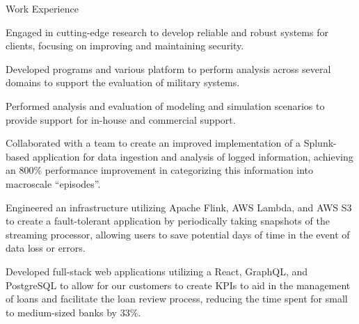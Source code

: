 \documentclass{resume} %
\begin{document}

\begin{workSection}{Work Experience}
    \experienceItem[
        company=Georgia Tech Research Institute (GTRI),
        location=Atlanta{,} GA,
        position=Graduate Research Assistant,
        duration=May 2024\textendash{Present}
    ]
    \begin{bullets}
        \item Engaged in cutting-edge research to develop reliable and robust systems for clients, focusing on improving and maintaining security.
        \item Developed programs and various platform to perform analysis across several domains to support the evaluation of military systems.
        \item Performed analysis and evaluation of modeling and simulation scenarios to provide support for in-house and commercial support.
    \end{bullets}
    
    \experienceItem[
        company=Splunk,
        location=San Jose{,} CA,
        position=Backend Software Engineer Intern,
        duration=May 2023\textendash{July 2023}
    ]
    \begin{bullets}
        \item Collaborated with a team to create an improved implementation of a Splunk-based application for data ingestion and analysis of logged information, achieving an 800\% performance improvement in categorizing this information into macroscale ``episodes''.
        \item Engineered an infrastructure utilizing Apache Flink, AWS Lambda, and AWS S3 to create a fault-tolerant application by periodically taking snapshots of the streaming processor, allowing users to save potential days of time in the event of data loss or errors.
    \end{bullets}
     
    \experienceItem[
        company=QwickRate,
        location=Marietta{,} GA (Remote),
        position=Software Engineer Intern,
        duration=August 2022\textendash{April 2023}
    ]
    \begin{bullets}
        \item Developed full-stack web applications utilizing a React, GraphQL, and PostgreSQL to allow for our customers to create KPIs to aid in the management of loans and facilitate the loan review process, reducing the time spent for small to medium-sized banks by 33\%.
    \end{bullets}


\end{workSection}
\end{document}
